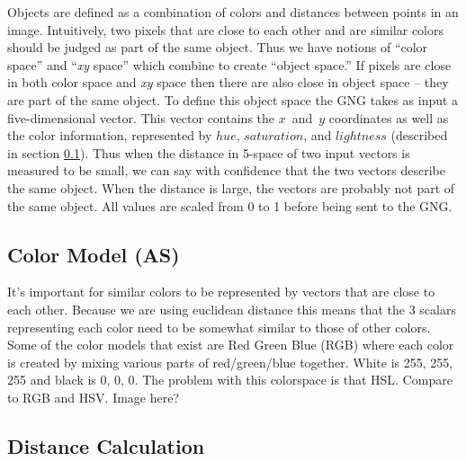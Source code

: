 \documentclass{article}
\renewcommand{\|}{\origbar} %
\newcommand{\xyspace}{{\em xy} space}
\begin{document}

Objects are defined as a combination of colors and distances between points in an image. Intuitively, two pixels that are close to each other and are similar colors should be judged as part of the same object. Thus we have notions of ``color space'' and ``\xyspace'' which combine to create ``object space.'' If pixels are close in both color space and \xyspace{} then there are also close in object space -- they are part of the same object. To define this object space the GNG takes as input a five-dimensional vector. This vector contains the $x$~and~$y$ coordinates as well as the color information, represented by $hue$, $saturation$, and $lightness$ (described in section \ref{sec:colorModel}). Thus when the distance in 5-space of two input vectors is measured to be small, we can say with confidence that the two vectors describe the same object. When the distance is large, the vectors are probably not part of the same object. All values are scaled from 0 to 1 before being sent to the GNG.

\subsection{Color Model (AS)}
\label{sec:colorModel}

It's important for similar colors to be represented by vectors that are close to each other. Because we are using euclidean distance this means that the 3 scalars representing each color need to be somewhat similar to those of other colors. Some of the color models that exist are Red Green Blue (RGB) where each color is created by mixing various parts of red/green/blue together. White is 255, 255, 255 and black is 0, 0, 0. The problem with this colorspace is that 
HSL. Compare to RGB and HSV. Image here?


\subsection{Distance Calculation}

\end{document}
